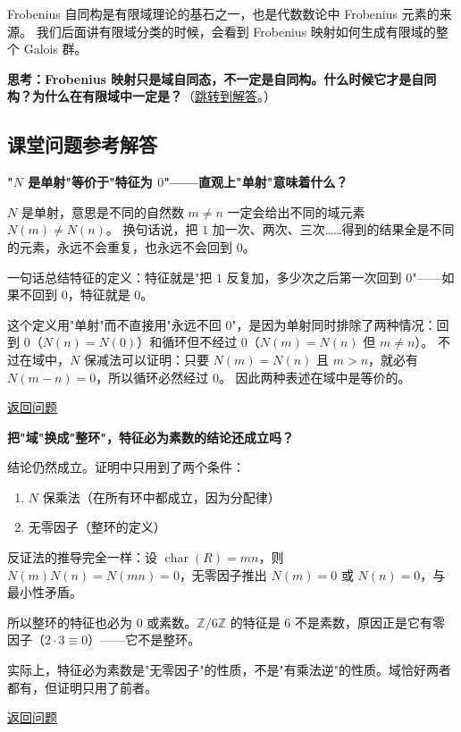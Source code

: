 Frobenius 自同构是有限域理论的基石之一，也是代数数论中 Frobenius 元素的来源。
我们后面讲有限域分类的时候，会看到 Frobenius 映射如何生成有限域的整个 Galois 群。

\hypertarget{q:frobenius-automorphism}{}
\medskip
\noindent\textbf{思考：Frobenius 映射只是域自同态，不一定是自同构。什么时候它才是自同构？为什么在有限域中一定是？}（\hyperlink{ans:frobenius-automorphism}{跳转到解答}。）
\medskip

\subsection*{课堂问题参考解答}

\begin{exercise}\label{ex:ans-char-definition-intuition}
\hypertarget{ans:char-definition-intuition}{}
\textbf{"$N$ 是单射"等价于"特征为 $0$"——直观上"单射"意味着什么？}

$N$ 是单射，意思是不同的自然数 $m \neq n$ 一定会给出不同的域元素 $N(m) \neq N(n)$。
换句话说，把 $1$ 加一次、两次、三次……得到的结果全是不同的元素，永远不会重复，也永远不会回到 $0$。

一句话总结特征的定义：特征就是"把 $1$ 反复加，多少次之后第一次回到 $0$"——如果不回到 $0$，特征就是 $0$。

这个定义用"单射"而不直接用"永远不回 $0$"，是因为单射同时排除了两种情况：回到 $0$（$N(n)=N(0)$）和循环但不经过 $0$（$N(m)=N(n)$ 但 $m \neq n$）。
不过在域中，$N$ 保减法可以证明：只要 $N(m) = N(n)$ 且 $m > n$，就必有 $N(m-n) = 0$，所以循环必然经过 $0$。
因此两种表述在域中是等价的。

\hyperlink{q:char-definition-intuition}{返回问题}
\end{exercise}

\begin{exercise}\label{ex:ans-char-prime-domain}
\hypertarget{ans:char-prime-domain}{}
\textbf{把"域"换成"整环"，特征必为素数的结论还成立吗？}

结论仍然成立。证明中只用到了两个条件：
\begin{enumerate}
    \item $N$ 保乘法（在所有环中都成立，因为分配律）
    \item 无零因子（整环的定义）
\end{enumerate}
反证法的推导完全一样：设 $\operatorname{char}(R) = mn$，则 $N(m)N(n) = N(mn) = 0$，无零因子推出 $N(m)=0$ 或 $N(n)=0$，与最小性矛盾。

所以整环的特征也必为 $0$ 或素数。$\mathbb{Z}/6\mathbb{Z}$ 的特征是 $6$ 不是素数，原因正是它有零因子（$2 \cdot 3 \equiv 0$）——它不是整环。

实际上，特征必为素数是"无零因子"的性质，不是"有乘法逆"的性质。域恰好两者都有，但证明只用了前者。

\hyperlink{q:char-prime-domain}{返回问题}
\end{exercise}

